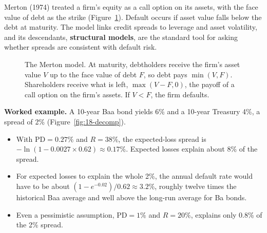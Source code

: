 Merton (1974) treated a firm's equity as a call option on its assets, with the face value of debt as the strike (Figure~\ref{fig:18-merton}). Default occurs if asset value falls below the debt at maturity. The model links credit spreads to leverage and asset volatility, and its descendants, \textbf{structural models}, are the standard tool for asking whether spreads are consistent with default risk.

\begin{figure}[htbp]
\centering
{}
\caption{The Merton model. At maturity, debtholders receive the firm's asset value $V$ up to the face value of debt $F$, so debt pays $\min(V, F)$. Shareholders receive what is left, $\max(V - F, 0)$, the payoff of a call option on the firm's assets. If $V < F$, the firm defaults.}
\label{fig:18-merton}
\end{figure}

\textbf{Worked example.} A 10-year Baa bond yields 6\% and a 10-year Treasury 4\%, a spread of 2\% (Figure~\ref{fig:18-decomp}).

\begin{itemize}
  \item With $\mathrm{PD} = 0.27\%$ and $R = 38\%$, the expected-loss spread is $-\ln(1 - 0.0027 \times 0.62) \approx 0.17\%$. Expected losses explain about 8\% of the spread.
  \item For expected losses to explain the whole 2\%, the annual default rate would have to be about $(1 - e^{-0.02})/0.62 \approx 3.2\%$, roughly twelve times the historical Baa average and well above the long-run average for Ba bonds.
  \item Even a pessimistic assumption, $\mathrm{PD} = 1\%$ and $R = 20\%$, explains only 0.8\% of the 2\% spread.
\end{itemize}

